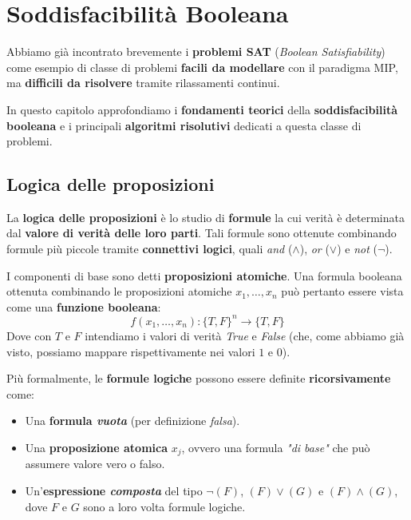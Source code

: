 
\chapter{Soddisfacibilità Booleana}

Abbiamo già incontrato brevemente i \textbf{problemi SAT} 
(\textit{Boolean Satisfiability}) come esempio di classe di problemi \textbf{facili da 
modellare} con il paradigma MIP, ma \textbf{difficili da risolvere} tramite rilassamenti 
continui.

In questo capitolo approfondiamo i \textbf{fondamenti teorici} della 
\textbf{soddisfacibilità booleana} e i principali \textbf{algoritmi risolutivi} 
dedicati a questa classe di problemi.

\section{Logica delle proposizioni}

La \textbf{logica delle proposizioni} è lo studio di \textbf{formule} la cui verità è 
determinata dal \textbf{valore di verità delle loro parti}. Tali formule sono ottenute 
combinando formule più piccole tramite \textbf{connettivi logici}, quali \textit{and} ($\land$), 
\textit{or} ($\lor$) e \textit{not} ($\neg$).

I componenti di base sono detti \textbf{proposizioni atomiche}. Una formula booleana 
ottenuta combinando le proposizioni atomiche $x_1, \ldots, x_n$ può pertanto essere 
vista come una \textbf{funzione booleana}:
\[
    f(x_1, \ldots, x_n) : \{T, F\}^n \to \{T, F\}
\]
Dove con $T$ e $F$ intendiamo i valori di verità \textit{True} e \textit{False} 
(che, come abbiamo già visto, possiamo mappare rispettivamente nei valori $1$ e $0$).

\begin{definition}
    Più formalmente, le \textbf{formule logiche} possono essere definite 
    \textbf{ricorsivamente} come:
    \begin{itemize}
        \item Una \textbf{formula \textit{vuota}} (per definizione \textit{falsa}).
        \item Una \textbf{proposizione atomica} $x_j$, ovvero una formula \textit{"di base"} 
            che può assumere valore vero o falso.
        \item Un'\textbf{espressione \textit{composta}} del tipo $\neg(F)$, $(F) \lor (G)$ e 
            $(F) \land (G)$, dove $F$ e $G$ sono a loro volta formule logiche.
    \end{itemize}
\end{definition}

